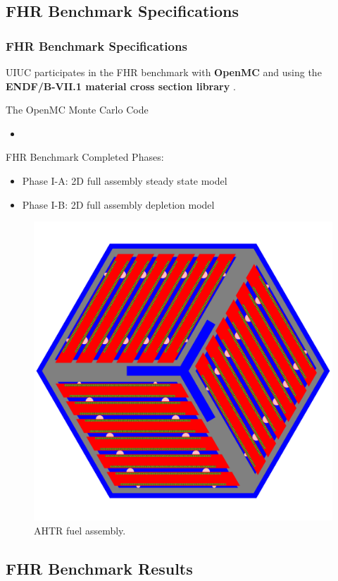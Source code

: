 \subsection{FHR Benchmark Specifications}
\begin{frame}
    \frametitle{FHR Benchmark Specifications}
    UIUC participates in the FHR benchmark with \textbf{OpenMC} \cite{romano_openmc:_2015} 
    and using the \textbf{ENDF/B-VII.1 material cross section library} \cite{chadwick_endf/b-vii.1_2011}. 

    The OpenMC Monte Carlo Code 
    \begin{itemize}
        \item 
    \end{itemize}

    FHR Benchmark Completed Phases: 
    \begin{itemize}
        \item Phase I-A: 2D full assembly steady state model 
        \item Phase I-B: 2D full assembly depletion model 
    \end{itemize}

    \begin{figure}[]
        \includegraphics[width=0.27\linewidth]{../docs/figures/ahtr-fuel-element.png} 
        \vspace{-0.2cm}
        \caption{AHTR fuel assembly.}
    \end{figure}
\end{frame}

\subsection{FHR Benchmark Results}

